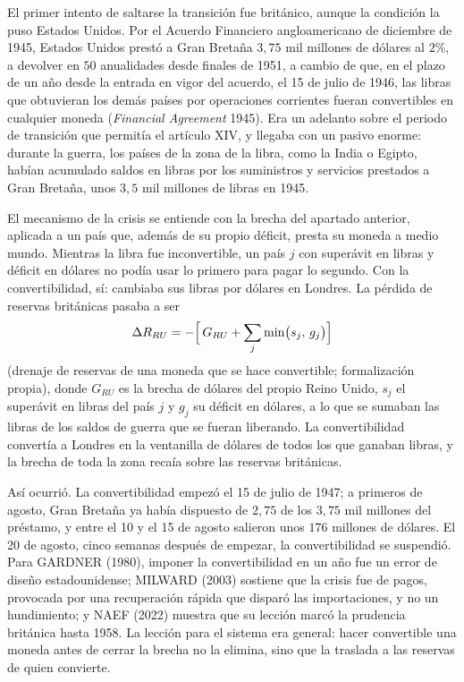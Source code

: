 \documentclass[10pt,a4paper]{article}
\begin{document}
El primer intento de saltarse la transición fue británico, aunque la condición la puso Estados Unidos. Por el Acuerdo Financiero angloamericano de diciembre de 1945, Estados Unidos prestó a Gran Bretaña $3{,}75$ mil millones de dólares al $2\%$, a devolver en $50$ anualidades desde finales de 1951, a cambio de que, en el plazo de un año desde la entrada en vigor del acuerdo, el 15 de julio de 1946, las libras que obtuvieran los demás países por operaciones corrientes fueran convertibles en cualquier moneda (\textit{Financial Agreement} 1945). Era un adelanto sobre el periodo de transición que permitía el artículo XIV, y llegaba con un pasivo enorme: durante la guerra, los países de la zona de la libra, como la India o Egipto, habían acumulado saldos en libras por los suministros y servicios prestados a Gran Bretaña, unos $3{,}5$ mil millones de libras en 1945.

El mecanismo de la crisis se entiende con la brecha del apartado anterior, aplicada a un país que, además de su propio déficit, presta su moneda a medio mundo. Mientras la libra fue inconvertible, un país $j$ con superávit en libras y déficit en dólares no podía usar lo primero para pagar lo segundo. Con la convertibilidad, sí: cambiaba sus libras por dólares en Londres. La pérdida de reservas británicas pasaba a ser
$$\Delta R_{RU} = -\Bigl[\,G_{RU} + \sum_{j}\min\bigl(s_j,\,g_j\bigr)\Bigr]$$
(drenaje de reservas de una moneda que se hace convertible; formalización propia), donde $G_{RU}$ es la brecha de dólares del propio Reino Unido, $s_j$ el superávit en libras del país $j$ y $g_j$ su déficit en dólares, a lo que se sumaban las libras de los saldos de guerra que se fueran liberando. La convertibilidad convertía a Londres en la ventanilla de dólares de todos los que ganaban libras, y la brecha de toda la zona recaía sobre las reservas británicas.

Así ocurrió. La convertibilidad empezó el 15 de julio de 1947; a primeros de agosto, Gran Bretaña ya había dispuesto de $2{,}75$ de los $3{,}75$ mil millones del préstamo, y entre el 10 y el 15 de agosto salieron unos $176$ millones de dólares. El 20 de agosto, cinco semanas después de empezar, la convertibilidad se suspendió. Para GARDNER (1980), imponer la convertibilidad en un año fue un error de diseño estadounidense; MILWARD (2003) sostiene que la crisis fue de pagos, provocada por una recuperación rápida que disparó las importaciones, y no un hundimiento; y NAEF (2022) muestra que su lección marcó la prudencia británica hasta 1958. La lección para el sistema era general: hacer convertible una moneda antes de cerrar la brecha no la elimina, sino que la traslada a las reservas de quien convierte.
\end{document}
